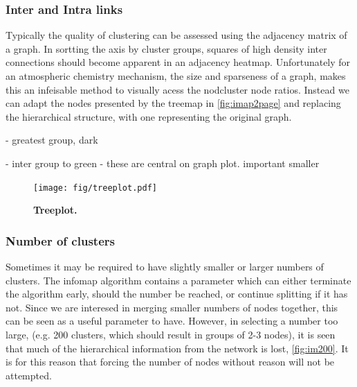 
\subsubsection{Inter and Intra links}
 Typically the quality of clustering can be assessed using the adjacency matrix of a graph. In sortting the axis by cluster groups, squares of high density inter connections should become apparent in an adjacency heatmap. Unfortunately for an atmospheric chemistry mechanism, the size and sparseness of a graph, makes this an infeisable method to visually acess the nodcluster node ratios. Instead we can adapt the nodes presented by the treemap in \autoref{fig:imap2page} and replacing the hierarchical structure, with one representing the original graph. 

-  greatest group, dark

- inter group to green - these are central on graph plot. important smaller
 
 
   \begin{figure}[H]
     \centering
     \texttt{[image: fig/treeplot.pdf]}
     \caption{\textbf{Treeplot.} }
         \label{fig:imtreeplot}
   \end{figure}



 

 \subsubsection{Number of clusters}
Sometimes it may be required to have slightly smaller or larger numbers of clusters. The infomap algorithm contains a  parameter which can either terminate the algorithm early, should the number be reached, or continue splitting if it has not. Since we are interesed in merging smaller numbers of nodes together, this can be seen as a useful parameter to have. However, in selecting a number too large, (e.g. 200 clusters, which should result in groups of 2-3 nodes), it is seen that much of the hierarchical information from the network is lost, \autoref{fig:im200}. It is for this reason that forcing the number of nodes without reason will not be attempted. 


